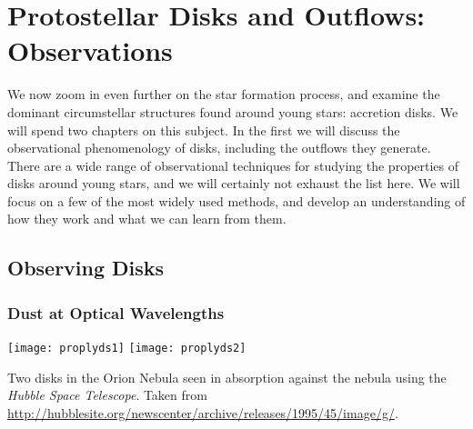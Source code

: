 \chapter{Protostellar Disks and Outflows: Observations}
\label{ch:disks_obs}


We now zoom in even further on the star formation process, and examine the dominant circumstellar structures found around young stars: accretion disks. We will spend two chapters on this subject. In the first we will discuss the observational phenomenology of disks, including the outflows they generate. There are a wide range of observational techniques for studying the properties of disks around young stars, and we will certainly not exhaust the list here. We will focus on a few of the most widely used methods, and develop an understanding of how they work and what we can learn from them.

\section{Observing Disks}

\subsection{Dust at Optical Wavelengths}

\begin{marginfigure}
\texttt{[image: proplyds1]}
\texttt{[image: proplyds2]}
\caption[Protostellar disks in absorption in the ONC]{
\label{fig:proplyds}
Two disks in the Orion Nebula seen in absorption against the nebula using the \textit{Hubble Space Telescope}. Taken from \url{http://hubblesite.org/newscenter/archive/releases/1995/45/image/g/}.
}
\end{marginfigure}

